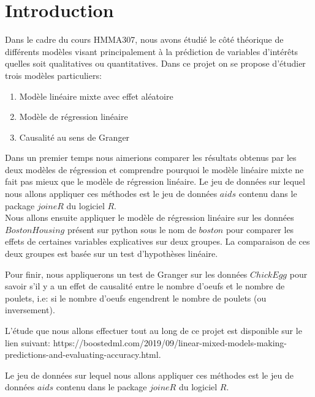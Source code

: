 \documentclass{article}
\begin{document}
\tableofcontents
\newpage
\section{Introduction}
\label{sec:introduction}

Dans le cadre du cours HMMA307, nous avons étudié le côté théorique de différents modèles visant principalement à la prédiction de variables d'intérêts quelles soit qualitatives ou quantitatives.
Dans ce projet on se propose d'étudier trois modèles particuliers:

\begin{enumerate}
    \item Modèle linéaire mixte avec effet aléatoire
    \item Modèle de régression linéaire
    \item Causalité au sens de Granger
\end{enumerate}
 

Dans un premier temps nous aimerions comparer les résultats obtenus par les deux modèles de régression et comprendre pourquoi le modèle linéaire mixte ne fait pas mieux que le modèle de régression linéaire. Le jeu de données sur lequel nous allons appliquer ces méthodes est le jeu de données $aids$ contenu dans le package $joineR$ du logiciel $R$.\\

Nous allons ensuite appliquer le modèle de régression linéaire sur les données $BostonHousing$ présent sur python sous le nom de $boston$ pour comparer les effets de certaines variables explicatives sur deux groupes. La comparaison de ces deux groupes est basée sur un test d'hypothèses linéaire. 

Pour finir, nous appliquerons un test de Granger sur les données $ChickEgg$ pour savoir s'il y a un effet de causalité entre le nombre d'oeufs et le nombre de poulets, i.e: si le nombre d'oeufs engendrent le nombre de poulets (ou inversement).



L'étude que nous allons effectuer tout au long de ce projet est disponible sur le lien suivant: https://boostedml.com/2019/09/linear-mixed-models-making-predictions-and-evaluating-accuracy.html.


Le jeu de données sur lequel nous allons appliquer ces méthodes est le jeu de données $aids$ contenu dans le package $joineR$ du logiciel $R$.
\end{document}
